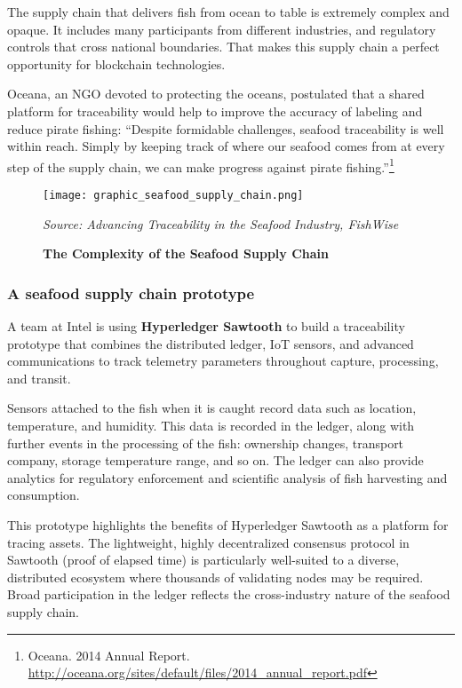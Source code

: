 The supply chain that delivers fish from ocean to table is extremely
complex and opaque.  It includes many participants from different
industries, and regulatory controls that cross national boundaries.
That makes this supply chain a perfect opportunity for blockchain
technologies.

Oceana, an NGO devoted to protecting the oceans, postulated that a
shared platform for traceability would help to improve the accuracy of
labeling and reduce pirate fishing: ``Despite formidable challenges,
seafood traceability is well within reach. Simply by keeping track of
where our seafood comes from at every step of the supply chain, we can
make progress against pirate fishing.''\footnote{ Oceana. 2014 Annual
Report. \url{http://oceana.org/sites/default/files/2014_annual_report.pdf}}

\newpage
\begin{figure}
\texttt{[image: graphic\_seafood\_supply\_chain.png]}
\caption{\textbf{The Complexity of the Seafood Supply Chain}}
\emph{Source: Advancing Traceability in the Seafood Industry, FishWise}
\end{figure}
\newpage

\subsubsection{A seafood supply chain prototype}

A team at Intel is using \textbf{Hyperledger Sawtooth} to build a
traceability prototype that combines the distributed ledger, IoT
sensors, and advanced communications to track telemetry parameters
throughout capture, processing, and transit.

Sensors attached to the fish when it is caught record data such as
location, temperature, and humidity.  This data is recorded in the
ledger, along with further events in the processing of the fish:
ownership changes, transport company, storage temperature range, and so
on.  The ledger can also provide analytics for regulatory enforcement
and scientific analysis of fish harvesting and consumption.

This prototype highlights the benefits of Hyperledger Sawtooth as a
platform for tracing assets.  The lightweight, highly decentralized
consensus protocol in Sawtooth (proof of elapsed time) is particularly
well-suited to a diverse, distributed ecosystem where thousands of
validating nodes may be required.  Broad participation in the ledger
reflects the cross-industry nature of the seafood supply chain.

